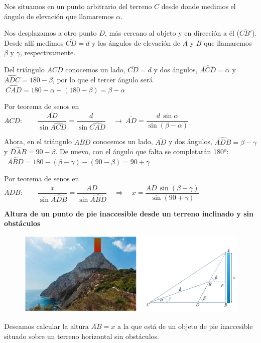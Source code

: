 Nos situamos en un punto arbitrario del terreno $C$ desde donde medimos el ángulo de elevación que llamaremos $\alpha$. 

Nos desplazamos a otro punto $D$, más cercano al objeto y en dirección a él \textcolor{gris}{($\overline{CB'}$)}. Desde allí medimos $\overline{CD}=d$ y los ángulos de elevación de $A$ y $B$ que llamaremos $\beta$ y $\gamma$, respectivamente.

Del triángulo $ACD$ conocemos un lado, $\overline{CD}=d$ y dos ángulos, $\widehat{ACD}=\alpha$ y $\widehat{ADC}=180-\beta$, por lo que el tercer ángulo será $\ \widehat{CAD}=180-\alpha-(180-\beta)=\beta-\alpha$

Por teorema de senos en $ACD:\qquad \dfrac{\overline{AD}}{\sin \widehat{ACD}}=\dfrac{d}{\sin \widehat{ CAD}} \quad \to \ \overline{AD}=\dfrac{d\, \sin \alpha}{\sin (\beta-\alpha)}$

Ahora, en el triángulo $ABD$ conocemos un lado, $\overline{AD}$ y dos ángulos, $\widehat{ADB}=\beta-\gamma$ y  $\widehat{DAB}=90-\beta$. De nuevo, con el ángulo que falta se completarán 180$^o$: $\ \ \widehat{ABD}=180-(\beta-\gamma)-(90-\beta)=90+\gamma$

Por teorema de senos en $ADB:\qquad  \dfrac{x}{\sin \widehat{ADB}}=\dfrac{\overline{AD}}{\sin \widehat{ABD}} \quad \Rightarrow \quad x=\dfrac{\overline{AD} \, \sin(\beta-\gamma)}{\sin (90+\gamma)}$

\vspace{8mm}
\begin{large}
\textbf{Altura de un punto de pie inaccesible desde un terreno inclinado y sin obstáculos}	
\end{large}

\begin{figure}[H]
	\centering
	\includegraphics[width=.9\textwidth]{img-triang/topog07.png}
\end{figure}

Deseamos calcular la altura $\overline{AB}=x$ a la que está de un objeto de pie inaccesible situado sobre un terreno horizontal sin obstáculos.

